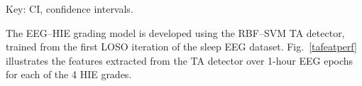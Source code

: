 \documentclass[conference]{IEEEtran}
\begin{document}
\begin{table}[!h]
\renewcommand{\arraystretch}{1.25}
\centering
\caption{Trac\'e alternant detection performance comparing the envelope function with the machine learning approach using a support vector machine (SVM).}
\label{taperf}
\setlength\tabcolsep{3.25pt}
\begin{flushleft} \footnotesize{Key: CI, confidence intervals.} \end{flushleft}
\end{table}




The EEG--HIE grading model is developed using the RBF--SVM TA detector, trained from the first LOSO iteration of the sleep EEG dataset. Fig.~\ref{tafeatperf} illustrates the features extracted from the TA detector over 1-hour EEG epochs for each of the 4 HIE grades. 
\end{document}
